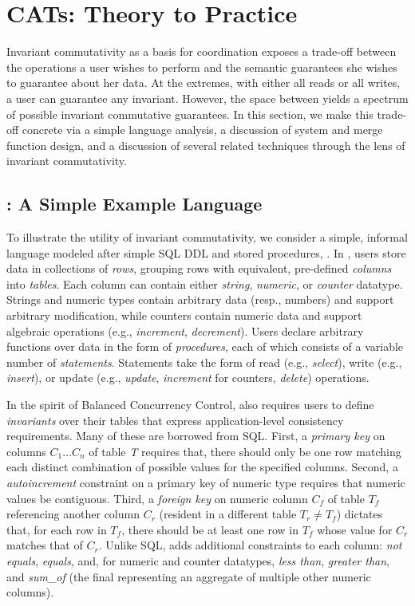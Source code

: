 
\section{CATs: Theory to Practice}
\label{sec:bcc-practice}

Invariant commutativity as a basis for coordination exposes a
trade-off between the operations a user wishes to perform and the
semantic guarantees she wishes to guarantee about her data. At the
extremes, with either all reads or all writes, a user can guarantee
any invariant. However, the space between yields a spectrum of
possible invariant commutative guarantees. In this section, we make
this trade-off concrete via a simple language analysis, a discussion
of system and merge function design, and a discussion of several
related techniques through the lens of invariant commutativity.

\subsection{\lang: A Simple Example Language}

To illustrate the utility of invariant commutativity, we consider a
simple, informal language modeled after simple SQL DDL and stored
procedures, \lang. In \lang, users store data in collections of
\textit{rows}, grouping rows with equivalent, pre-defined
\textit{columns} into \textit{tables}. Each column can contain either
\textit{string}, \textit{numeric}, or \textit{counter}
datatype. Strings and numeric types contain arbitrary data (resp.,
numbers) and support arbitrary modification, while counters contain
numeric data and support algebraic operations (e.g.,
\textit{increment}, \textit{decrement}). Users declare arbitrary
functions over data in the form of \textit{procedures}, each of which
consists of a variable number of \textit{statements}. Statements take
the form of read (e.g., \textit{select}), write (e.g.,
\textit{insert}), or update (e.g., \textit{update}, \textit{increment}
for counters, \textit{delete}) operations.

In the spirit of Balanced Concurrency Control, \lang also requires
users to define \textit{invariants} over their tables that express
application-level consistency requirements. Many of these are borrowed
from SQL. First, a \textit{primary key} on columns $C_1 \dots C_n$ of
table \textit{T} requires that, there should only be one row matching
each distinct combination of possible values for the specified
columns. Second, a \textit{autoincrement} constraint on a primary key
of numeric type requires that numeric values be contiguous. Third, a
\textit{foreign key} on numeric column $C_f$ of table $T_f$
referencing another column $C_r$ (resident in a different table $T_r
\neq T_f$) dictates that, for each row in $T_f$, there should be at
least one row in $T_f$ whose value for $C_r$ matches that of
$C_r$. Unlike SQL, \lang adds additional constraints to each column:
\textit{not equals}, \textit{equals}, and, for numeric and counter
datatypes, \textit{less than}, \textit{greater than}, and
\textit{sum\_of} (the final representing an aggregate of multiple
other numeric columns).


